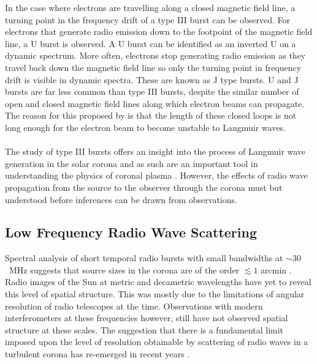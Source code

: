 In the case where electrons are travelling along a closed magnetic field line, a turning point in the frequency drift of a type III burst can be observed. For electrons that generate radio emission down to the footpoint of the magnetic field line, a U burst is observed. A U burst can be identified as an inverted U on a dynamic spectrum. More often, electrons stop generating radio emission as they travel back down the magnetic field line so only the turning point in frequency drift is visible in dynamic spectra. These are known as J type bursts. U and J bursts are far less common than type III bursts, despite the similar number of open and closed magnetic field lines along which electron beams can propagate. The reason for this proposed by \cite{Reid2017} is that the length of these closed loops is not long enough for the electron beam to become unstable to Langmuir waves.

\paragraph*{} The study of type III bursts offers an insight into the process of Langmuir wave generation in the solar corona and as such are an important tool in understanding the physics of coronal plasma \citep{Reid2014}. However, the effects of radio wave propagation from the source to the observer through the corona must but understood before inferences can be drawn from observations. 

\subsection{Low Frequency Radio Wave Scattering}

Spectral analysis of short temporal radio bursts with small bandwidths at $\sim 30$~MHz suggests that source sizes in the corona are of the order $\lesssim 1$ arcmin \citep{McConnell1980, Kontar2017}. Radio images of the Sun at metric and decametric wavelengths have yet to reveal this level of spatial structure. This was mostly due to the limitations of angular resolution of radio telescopes at the time. 
Observations with modern interferometers at these frequencies however, still have not observed spatial structure at these scales. The suggestion that there is a fundamental limit imposed upon the level of resolution obtainable by scattering of radio waves in a turbulent corona \citep{Bastian1994} has re-emerged in recent years \citep{Thejappa2007,Thejappa2008,Kontar2017,Kontar2019}. 

